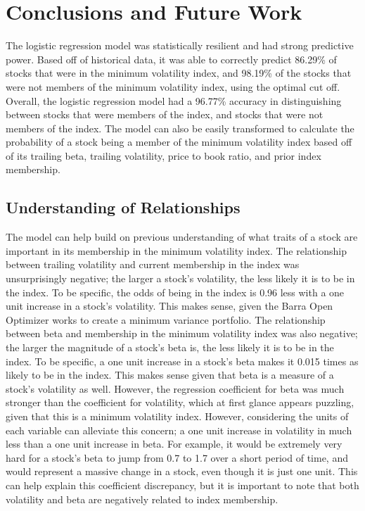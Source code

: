 \documentclass[12pt,twoside]{reedthesis}
\theoremstyle{definition}
\theoremstyle{definition}
\theoremstyle{definition}
\theoremstyle{remark}
\begin{document}
\chapter{Conclusions and Future Work}\label{conclusions-and-future-work}

The logistic regression model was statistically resilient and had strong
predictive power. Based off of historical data, it was able to correctly
predict 86.29\% of stocks that were in the minimum volatility index, and
98.19\% of the stocks that were not members of the minimum volatility
index, using the optimal cut off. Overall, the logistic regression model
had a 96.77\% accuracy in distinguishing between stocks that were
members of the index, and stocks that were not members of the index. The
model can also be easily transformed to calculate the probability of a
stock being a member of the minimum volatility index based off of its
trailing beta, trailing volatility, price to book ratio, and prior index
membership.

\section{Understanding of
Relationships}\label{understanding-of-relationships}

The model can help build on previous understanding of what traits of a
stock are important in its membership in the minimum volatility index.
The relationship between trailing volatility and current membership in
the index was unsurprisingly negative; the larger a stock's volatility,
the less likely it is to be in the index. To be specific, the odds of
being in the index is 0.96 less with a one unit increase in a stock's
volatility. This makes sense, given the Barra Open Optimizer works to
create a minimum variance portfolio. The relationship between beta and
membership in the minimum volatility index was also negative; the larger
the magnitude of a stock's beta is, the less likely it is to be in the
index. To be specific, a one unit increase in a stock's beta makes it
0.015 times as likely to be in the index. This makes sense given that
beta is a measure of a stock's volatility as well. However, the
regression coefficient for beta was much stronger than the coefficient
for volatility, which at first glance appears puzzling, given that this
is a minimum volatility index. However, considering the units of each
variable can alleviate this concern; a one unit increase in volatility
in much less than a one unit increase in beta. For example, it would be
extremely very hard for a stock's beta to jump from 0.7 to 1.7 over a
short period of time, and would represent a massive change in a stock,
even though it is just one unit. This can help explain this coefficient
discrepancy, but it is important to note that both volatility and beta
are negatively related to index membership.
\end{document}
